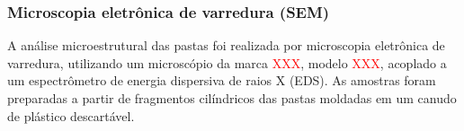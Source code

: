 \subsubsection{Microscopia eletrônica de varredura (SEM)}
\label{subsubsec:microscopia_eletronica_de_varredura}

A análise microestrutural das pastas foi realizada por microscopia eletrônica de varredura, utilizando um microscópio da marca \textcolor{red}{XXX}, modelo \textcolor{red}{XXX}, acoplado a um espectrômetro de energia dispersiva de raios X (EDS). As amostras foram preparadas a partir de fragmentos cilíndricos das pastas moldadas em um canudo de plástico descartável. 

